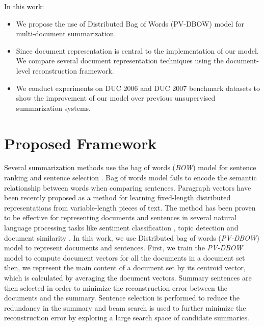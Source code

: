 \documentclass[11pt,a4paper]{article}
\begin{document}
In this work:
\begin{itemize}
  \item We propose the use of Distributed Bag of Words (PV-DBOW) model for multi-document summarization. 
\item Since document representation is central to the implementation of our model. We compare several document representation techniques using the document-level reconstruction framework.
  \item We conduct experiments on DUC 2006 and DUC 2007 benchmark datasets to show the improvement of our model over previous unsupervised summarization systems. 
  
\end{itemize}

\section{Proposed Framework}
Several summarization methods use the bag of words (\textit{BOW}) model for sentence ranking and sentence selection  \cite{lexrank,centroid}. Bag of words model fails to encode the semantic relationship between words when comparing sentences.  Paragraph vectors \cite{pv} have been recently proposed as a method for learning fixed-length distributed representations from variable-length pieces of text.  The method has been proven to be effective for representing documents and sentences in several natural language processing tasks like sentiment classification \cite{pv}, topic detection \cite{topic} and document similarity \cite{docembed}. In this work, we use Distributed bag of words (\textit{PV-DBOW}) model to represent documents and sentences. First, we train the \textit{PV-DBOW} model to compute document vectors for all the documents in a document set then, we represent the main content of a document set by its centroid vector, which is calculated by averaging the document vectors. Summary sentences are then selected in order to minimize the reconstruction error between the documents and the summary. Sentence selection is performed to reduce the redundancy in the summary and beam search is used to further minimize the reconstruction error by exploring a large search space of candidate summaries. 
\end{document}
